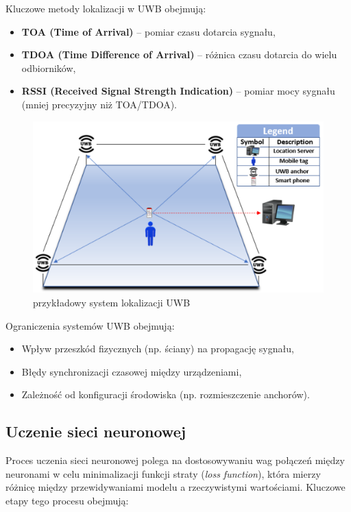 \documentclass{classrep}
\begin{document}
Kluczowe metody lokalizacji w UWB obejmują:
\begin{itemize}
	\item \textbf{TOA (Time of Arrival)} -- pomiar czasu dotarcia sygnału,
	\item \textbf{TDOA (Time Difference of Arrival)} -- różnica czasu dotarcia do wielu odbiorników,
	\item \textbf{RSSI (Received Signal Strength Indication)} -- pomiar mocy sygnału (mniej precyzyjny niż TOA/TDOA).
\end{itemize}

\begin{figure}[h!]
	\centering
	\includegraphics[scale=0.1]{uwb.png}
	\caption{przykładowy system lokalizacji UWB}
	\label{fig:uwb}
\end{figure}

\noindent Ograniczenia systemów UWB obejmują:
\begin{itemize}
	\item Wpływ przeszkód fizycznych (np. ściany) na propagację sygnału,
	\item Błędy synchronizacji czasowej między urządzeniami,
	\item Zależność od konfiguracji środowiska (np. rozmieszczenie anchorów).
\end{itemize}
\clearpage{}
\subsection{Uczenie sieci neuronowej}
Proces uczenia sieci neuronowej polega na dostosowywaniu wag połączeń między neuronami w celu minimalizacji funkcji straty (\textit{loss function}), która mierzy różnicę między przewidywaniami modelu a rzeczywistymi wartościami. Kluczowe etapy tego procesu obejmują:
\end{document}
